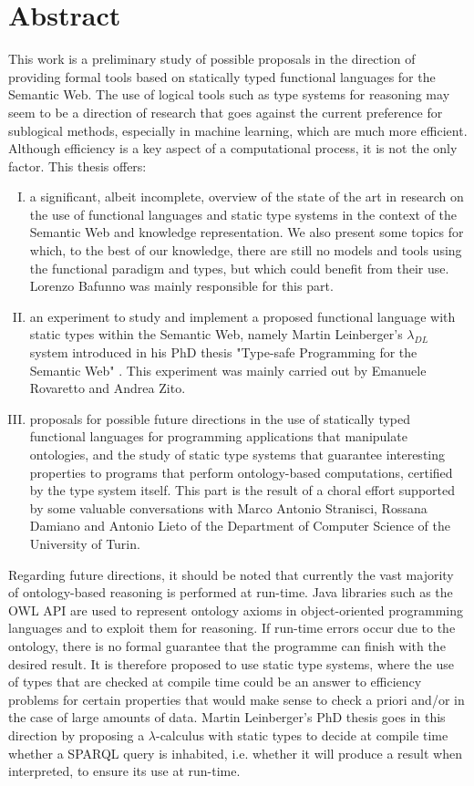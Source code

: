 \chapter*{Abstract}
This work is a preliminary study of possible proposals in the direction of providing formal tools based on statically typed functional languages for the Semantic Web. The use of logical tools such as type systems for reasoning may seem to be a direction of research that goes against the current preference for sublogical methods, especially in machine learning, which are much more efficient. Although efficiency is a key aspect of a computational process, it is not the only factor.
This thesis offers:
\begin{enumerate}[I.]
	\item a significant, albeit incomplete, overview of the state of the art in research on the use of functional languages and static type systems in the context of the Semantic Web and knowledge representation. We also present some topics for which, to the best of our knowledge, there are still no models and tools using the functional paradigm and types, but which could benefit from their use. Lorenzo Bafunno was mainly responsible for this part.
	\item  an experiment to study and implement a proposed functional language with static types within the Semantic Web, namely Martin Leinberger's $\lambda_{DL}$ system introduced in his PhD thesis "Type-safe Programming for the Semantic Web" \cite{leinbergerphdthesis}. This experiment was mainly carried out by Emanuele Rovaretto and Andrea Zito.
	\item proposals for possible future directions in the use of statically typed functional languages for programming applications that manipulate ontologies, and the study of static type systems that guarantee interesting properties to programs that perform ontology-based computations, certified by the type system itself. This part is the result of a choral effort supported by some valuable conversations with Marco Antonio Stranisci, Rossana Damiano and Antonio Lieto of the Department of Computer Science of the University of Turin.
\end{enumerate}
\noindent
Regarding future directions, it should be noted that currently the vast majority of ontology-based reasoning is performed at run-time. Java libraries such as the OWL API \cite{OWLAPI} are used to represent ontology axioms in object-oriented programming languages and to exploit them for reasoning. If run-time errors occur due to the ontology, there is no formal guarantee that the programme can finish with the desired result. It is therefore proposed to use static type systems, where the use of types that are checked at compile time could be an answer to efficiency problems for certain properties that would make sense to check a priori and/or in the case of large amounts of data. Martin Leinberger's PhD thesis \cite{leinbergerphdthesis} goes in this direction by proposing a $\lambda$-calculus with static types to decide at compile time whether a SPARQL query is inhabited, i.e. whether it will produce a result when interpreted, to ensure its use at run-time.
